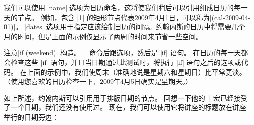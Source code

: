 
我们可以使用 |name| 选项为日历命名，这将使我们稍后可以引用组成日历的每一天的节点。 例如，包含 |1| 的矩形节点代表2009年4月1日，可以称为|(cal-2009-04-01)|。  |dates| 选项用于指定应该绘制日历的间隔。约翰内斯的日历中将需要几个月的时间，但是上面的示例仅显示了两周的时间来节省一些空间。


注意|if (weekend)| 构造。  |\calendar| 命令后跟选项，然后是 |if| 语句。 在日历的每一天都会检查这些 |if| 语句，并且当日期通过此测试时，将执行 |if| 语句之后的选项或代码。 在上面的示例中，我们使周末（准确地说是星期六和星期日）比平常更淡。（使用您喜欢的日历检查一下，2009年4月5日确实是星期天。）


如上所述，约翰内斯可以引用用于排版日期的节点。 回想一下他的 |\lecture| 宏已经接受了一个日期，我们还没有使用过。 现在，我们可以使用它将讲座的标题放在讲座举行的日期旁边：

%
\begin{codeexample}
\def\lecture#1#2#3#4#5#6{
  \node [annotation, #3, scale=0.65, text width=4cm, inner sep=2mm] at (#4) {
    Lecture #1: \textcolor{orange}{\textbf{#2}}
    \list{--}{\topsep=2pt\itemsep=0pt\parsep=0pt
              \parskip=0pt\labelwidth=8pt\leftmargin=8pt
              \itemindent=0pt\labelsep=2pt}
    #5
    \endlist
  };
  \node [anchor=base west] at (cal-#6.base east) {\textcolor{orange}{\textbf{#2}}};
}
\end{codeexample}
\def\lecture#1#2#3#4#5#6{
  \node [anchor=base west] at (cal-#6.base east) {\textcolor{orange}{\textbf{#2}}};
}

